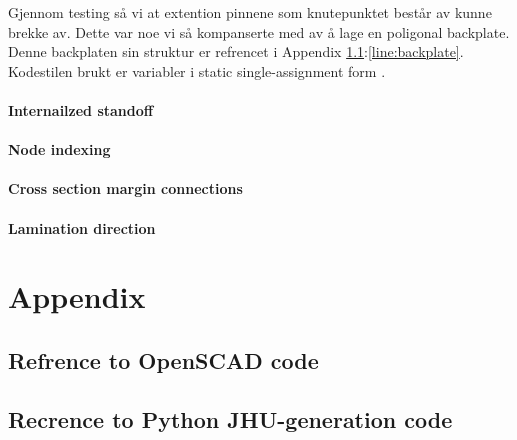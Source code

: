 \documentclass{report}
\begin{document}
Gjennom testing så vi at extention pinnene som knutepunktet består av kunne brekke av. Dette var noe vi så kompanserte med av å lage en poligonal backplate. Denne backplaten sin struktur er refrencet i Appendix \ref{sec:openscad}:\ref{line:backplate}. Kodestilen brukt er variabler i static single-assignment form \cite{wiki:ssaf}.

\subsubsection {Internailzed standoff}

\subsubsection {Node indexing}
\subsubsection {Cross section margin connections}
\subsubsection {Lamination direction}

\chapter{Appendix}

\section{Refrence to OpenSCAD code}
\label{sec:openscad}



\section{Recrence to Python JHU-generation code}
\label{sec:jhu-gen}



\listoffigures


\end{document}
